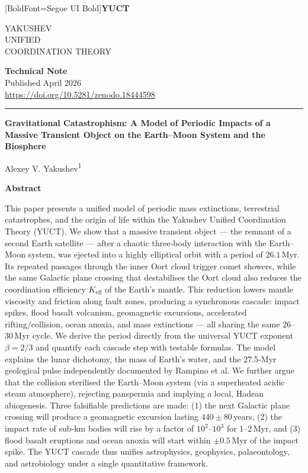 \documentclass[11pt,a4paper]{article}
\newcommand{\makeheader}{%
	\noindent
	\begin{minipage}{0.17\textwidth}
		\raggedright
		{\fontspec{Segoe UI}[BoldFont=Segoe UI Bold]\bfseries\color{skyblue}\fontsize{46}{46}\selectfont YUCT}%
	\end{minipage}%
	\hspace{30pt}
	\begin{minipage}{0.32\textwidth}
		\raggedright
		{\sffamily\fontsize{11}{13}\selectfont YAKUSHEV\\ UNIFIED\\ COORDINATION THEORY}%
	\end{minipage}%
	\hfill
	\begin{minipage}{0.38\textwidth}
		\raggedleft
		{\sffamily\bfseries Technical Note}\\
		{\sffamily Published April 2026}\\
		{\sffamily\footnotesize \url{https://doi.org/10.5281/zenodo.18444598}}%
	\end{minipage}
	\par\vspace{5pt}
	\noindent\textcolor{gold}{\rule{\textwidth}{1.6pt}}
	\par\vspace{0pt}
}
\begin{document}
	\thispagestyle{firstpage}
	\makeheader
	
	\vspace{0cm}
	{\LARGE\bfseries Gravitational Catastrophism: A Model of Periodic Impacts of a Massive Transient Object on the Earth–Moon System and the Biosphere \par}
	\vspace{0.2cm}
	
	{\large Alexey V. Yakushev\textsuperscript{1}} \\
	\vspace{0.0cm}
	
	{\color{darkblue}\textbf{\LARGE Abstract}} \par
	{\large
		\noindent
		This paper presents a unified model of periodic mass extinctions, terrestrial catastrophes, and the origin of life within the Yakushev Unified Coordination Theory (YUCT). We show that a massive transient object — the remnant of a second Earth satellite — after a chaotic three‑body interaction with the Earth–Moon system, was ejected into a highly elliptical orbit with a period of \(26.1\) Myr. Its repeated passages through the inner Oort cloud trigger comet showers, while the same Galactic plane crossing that destabilises the Oort cloud also reduces the coordination efficiency \(K_{\mathrm{eff}}\) of the Earth’s mantle. This reduction lowers mantle viscosity and friction along fault zones, producing a synchronous cascade: impact spikes, flood basalt volcanism, geomagnetic excursions, accelerated rifting/collision, ocean anoxia, and mass extinctions — all sharing the same \(26\)–\(30\) Myr cycle. We derive the period directly from the universal YUCT exponent \(\beta = 2/3\) and quantify each cascade step with testable formulas. The model explains the lunar dichotomy, the mass of Earth’s water, and the 27.5‑Myr geological pulse independently documented by Rampino et al. We further argue that the collision sterilised the Earth–Moon system (via a superheated acidic steam atmosphere), rejecting panspermia and implying a local, Hadean abiogenesis. Three falsifiable predictions are made: (1) the next Galactic plane crossing will produce a geomagnetic excursion lasting \(440 \pm 80\) years, (2) the impact rate of sub‑km bodies will rise by a factor of \(10^{2}\)–\(10^{3}\) for 1–2 Myr, and (3) flood basalt eruptions and ocean anoxia will start within \(\pm 0.5\) Myr of the impact spike. The YUCT cascade thus unifies astrophysics, geophysics, palaeontology, and astrobiology under a single quantitative framework.}
	
\end{document}

